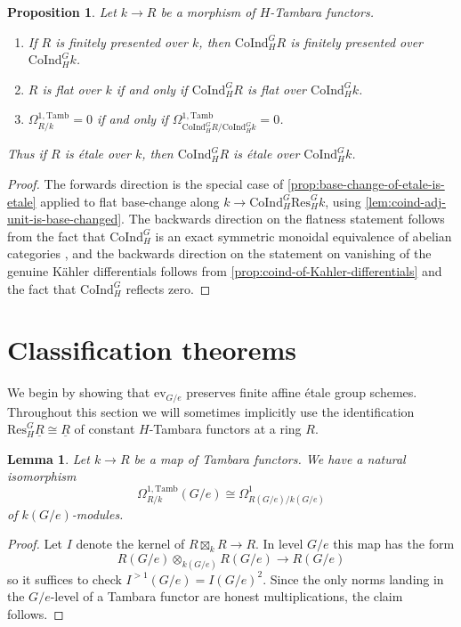 \documentclass[11pt,dvipsnames]{amsart}
\newtheorem{lemma}[theorem]{Lemma}
\newtheorem{proposition}[theorem]{Proposition}
\theoremstyle{BoldRemark}
\newcommand{\Res}{\mathrm{Res}}
\newcommand{\Coind}{\mathrm{CoInd}}
\newcommand{\ev}{\mathrm{ev}}
\newcommand{\Tamb}{\mathrm{Tamb}}
\begin{document}
\begin{proposition}\label{prop:coind-preserves-etale}
	Let $k \rightarrow R$ be a morphism of $H$-Tambara functors. 
    \begin{enumerate}
        \item If $R$ is finitely presented over $k$, then $\Coind_H^G R$ is finitely presented over $\Coind_H^G k$.
        \item $R$ is flat over $k$ if and only if $\Coind_H^G R$ is flat over $\Coind_H^G k$.
        \item $\Omega^{1,\Tamb}_{R/k} = 0$ if and only if $\Omega^{1,\Tamb}_{\Coind_H^G R/\Coind_H^G k} = 0$.
    \end{enumerate}
    Thus if $R$ is \'{e}tale over $k$, then $\Coind_H^G R$ is \'{e}tale over $\Coind_H^G k$. 
\end{proposition}

\begin{proof}
    The forwards direction is the special case of \cref{prop:base-change-of-etale-is-etale} applied to flat base-change along $k \rightarrow \Coind_H^G \Res_H^G k$, using \cref{lem:coind-adj-unit-is-base-changed}. The backwards direction on the flatness statement follows from the fact that $\Coind_H^G$ is an exact symmetric monoidal equivalence of abelian categories \cite[Theorem F]{Wis25a}, and the backwards direction on the statement on vanishing of the genuine K\"{a}hler differentials follows from \cref{prop:coind-of-Kahler-differentials} and the fact that $\Coind_H^G$ reflects zero.
\end{proof}

\section{Classification theorems}

We begin by showing that $\ev_{G/e}$ preserves finite affine \'{e}tale group schemes. Throughout this section we will sometimes implicitly use the identification $\Res_H^G \underline{R} \cong \underline{R}$ of constant $H$-Tambara functors at a ring $R$.

\begin{lemma}\label{lem:bottom-level-of-Kahler-differentials}
	Let $k \rightarrow R$ be a map of Tambara functors. We have a natural isomorphism
	\[ 
		\Omega^{1,\Tamb}_{R/k}(G/e) \cong \Omega^1_{R(G/e)/k(G/e)}
	\]
	of $k(G/e)$-modules.
\end{lemma}

\begin{proof}
	Let $I$ denote the kernel of $R \boxtimes_k R \rightarrow R$. In level $G/e$ this map has the form 
	\[ 
		R(G/e) \otimes_{k(G/e)} R(G/e) \rightarrow R(G/e) 
	\] 
	so it suffices to check $I^{>1}(G/e) = I(G/e)^2$. Since the only norms landing in the $G/e$-level of a Tambara functor are honest multiplications, the claim follows.
\end{proof}
\end{document}
